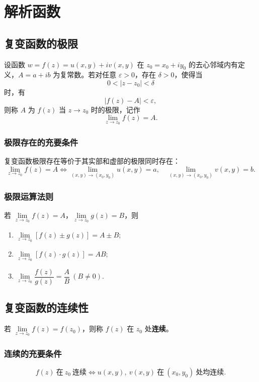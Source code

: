 \chapter{解析函数}
	
	\section{复变函数的极限}
	设函数 \(w=f(z)=u(x,y)+iv(x,y)\) 在 \(z_0=x_0+iy_0\) 的去心邻域内有定义，\(A=a+ib\) 为复常数。若对任意 \(\varepsilon>0\)，存在 \(\delta>0\)，使得当
	\[
	0<|z-z_0|<\delta
	\]
	时，有
	\[
	|f(z)-A|<\varepsilon,
	\]
	则称 \(A\) 为 \(f(z)\) 当 \(z\to z_0\) 时的极限，记作
	\[
	\lim_{z\to z_0}f(z)=A.
	\]
	
	\subsection{极限存在的充要条件}
	复变函数极限存在等价于其实部和虚部的极限同时存在：
	\[
	\lim_{z\to z_0}f(z)=A\iff
	\lim_{(x,y)\to(x_0,y_0)}u(x,y)=a,\quad
	\lim_{(x,y)\to(x_0,y_0)}v(x,y)=b.
	\]
	
	\subsection{极限运算法则}
	若 \(\lim\limits_{z\to z_0}f(z)=A\)，\(\lim\limits_{z\to z_0}g(z)=B\)，则
	\begin{enumerate}
		\item \(\lim\limits_{z\to z_0}[f(z)\pm g(z)]=A\pm B\);
		\item \(\lim\limits_{z\to z_0}[f(z)\cdot g(z)]=AB\);
		\item \(\lim\limits_{z\to z_0}\dfrac{f(z)}{g(z)}=\dfrac{A}{B}\ (B\neq 0)\).
	\end{enumerate}
	
	\section{复变函数的连续性}
	\begin{tcolorbox}[title=定义：复变函数的连续性, colframe=blue!50!black, colback=blue!5!white, sharp corners]
		若 \(\lim\limits_{z\to z_0}f(z)=f(z_0)\)，则称 \(f(z)\) 在 \(z_0\) 处\textbf{连续}。
	\end{tcolorbox}
	
	\subsection{连续的充要条件}
	\[
	f(z)\ \text{在}\ z_0\ \text{连续}
	\iff
	u(x,y),\ v(x,y)\ \text{在}\ (x_0,y_0)\ \text{处均连续}.
	\]
	
